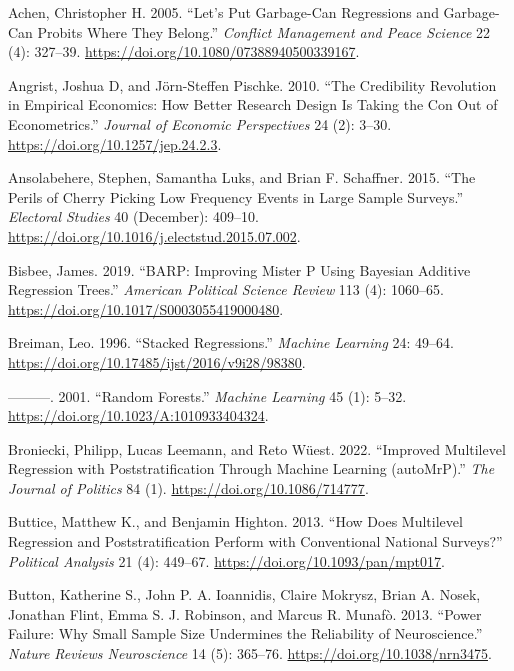 \documentclass[
]{article}
\newlength{\cslhangindent}
\newenvironment{CSLReferences}[2] %
 {%
  \setlength{\parindent}{0pt}
  \ifodd #1 \everypar{\setlength{\hangindent}{\cslhangindent}}\ignorespaces\fi
  \ifnum #2 > 0
  \setlength{\parskip}{#2\baselineskip}
  \fi
 }%
 {}
\begin{document}
\hypertarget{refs}{}
\begin{CSLReferences}{1}{0}
\leavevmode{}%
Achen, Christopher H. 2005. {``Let's Put Garbage-Can Regressions and
Garbage-Can Probits Where They Belong.''} \emph{Conflict Management and
Peace Science} 22 (4): 327--39.
\url{https://doi.org/10.1080/07388940500339167}.

\leavevmode{}%
Angrist, Joshua D, and Jörn-Steffen Pischke. 2010. {``The Credibility
Revolution in Empirical Economics: How Better Research Design Is Taking
the Con Out of Econometrics.''} \emph{Journal of Economic Perspectives}
24 (2): 3--30. \url{https://doi.org/10.1257/jep.24.2.3}.

\leavevmode{}%
Ansolabehere, Stephen, Samantha Luks, and Brian F. Schaffner. 2015.
{``The Perils of Cherry Picking Low Frequency Events in Large Sample
Surveys.''} \emph{Electoral Studies} 40 (December): 409--10.
\url{https://doi.org/10.1016/j.electstud.2015.07.002}.

\leavevmode{}%
Bisbee, James. 2019. {``BARP: Improving Mister P Using Bayesian Additive
Regression Trees.''} \emph{American Political Science Review} 113 (4):
1060--65. \url{https://doi.org/10.1017/S0003055419000480}.

\leavevmode{}%
Breiman, Leo. 1996. {``Stacked Regressions.''} \emph{Machine Learning}
24: 49--64. \url{https://doi.org/10.17485/ijst/2016/v9i28/98380}.

\leavevmode{}%
---------. 2001. {``Random Forests.''} \emph{Machine Learning} 45 (1):
5--32. \url{https://doi.org/10.1023/A:1010933404324}.

\leavevmode{}%
Broniecki, Philipp, Lucas Leemann, and Reto Wüest. 2022. {``Improved
Multilevel Regression with Poststratification Through Machine Learning
(autoMrP).''} \emph{The Journal of Politics} 84 (1).
\url{https://doi.org/10.1086/714777}.

\leavevmode{}%
Buttice, Matthew K., and Benjamin Highton. 2013. {``How Does Multilevel
Regression and Poststratification Perform with Conventional National
Surveys?''} \emph{Political Analysis} 21 (4): 449--67.
\url{https://doi.org/10.1093/pan/mpt017}.

\leavevmode{}%
Button, Katherine S., John P. A. Ioannidis, Claire Mokrysz, Brian A.
Nosek, Jonathan Flint, Emma S. J. Robinson, and Marcus R. Munafò. 2013.
{``Power Failure: Why Small Sample Size Undermines the Reliability of
Neuroscience.''} \emph{Nature Reviews Neuroscience} 14 (5): 365--76.
\url{https://doi.org/10.1038/nrn3475}.


\end{CSLReferences}
\end{document}
